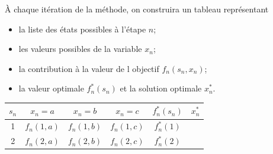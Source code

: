 À chaque itération de la méthode, on construira un tableau représentant
\begin{itemize}
\item
la liste des états possibles à l'étape $n$;
\item
les valeurs possibles de la variable $x_n$;
\item
la contribution à la valeur de l objectif $f_n(s_n,x_n)$;
\item
la valeur optimale $f^*_n(s_n)$ et la solution optimale $x_n^*$.
\end{itemize}

\begin{center}
\begin{tabular}{|c|c|c|c|c|c|}
\hline
$s_n$ & $x_n = a$ & $x_n = b$ & $x_n = c$ & $f_n^*(s_n)$ & $x_n^*$ \\
\hline
1 & $f_n(1,a)$ & $f_n(1,b)$ & $f_n(1,c)$ & $f_n^*(1)$ & \\
\hline
2 & $f_n(2,a)$ & $f_n(2,b)$ & $f_n(2,c)$ & $f_n^*(2)$ & \\
\hline
\end{tabular}
\end{center}

